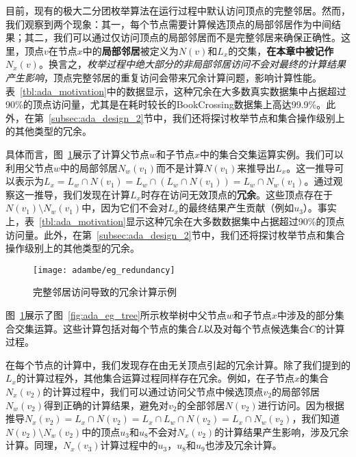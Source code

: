 目前，现有的极大二分团枚举算法在运行过程中默认访问顶点的完整邻居。然而，我们观察到两个现象：其一，每个节点需要计算候选顶点的局部邻居作为中间结果；其二，我们可以通过仅访问顶点的局部邻居而不是完整邻居来确保正确性。这里，顶点$v$在节点$x$中的\textbf{局部邻居}被定义为$N(v)$和$L_x$的交集，\textbf{在本章中被记作$N_x(v)$}。换言之，\emph{枚举过程中绝大部分的非局部邻居访问不会对最终的计算结果产生影响}，顶点完整邻居的重复访问会带来冗余计算问题，影响计算性能。表~\ref{tbl:ada_motivation}中的数据显示，这种冗余在大多数真实数据集中占据超过90\%的顶点访问量，尤其是在耗时较长的BookCrossing数据集上高达99.9\%。此外，在第~\ref{subsec:ada_design_2}节中，我们还将探讨枚举节点和集合操作级别上的其他类型的冗余。

具体而言，图~\ref{fig:ada_motivation_2}展示了计算父节点$w$和子节点$x$中的集合交集运算实例。我们可以利用父节点$w$中的局部邻居$N_w(v_1)$而不是计算$N(v_1)$来推导出$L_x$。这一推导可以表示为$L_x = L_w \cap N(v_1) = L_w \cap (L_w \cap N(v_1)) = L_w \cap N_w(v_1)$。通过观察这一推导，我们发现在计算$L_x$时存在访问无效顶点的\textbf{冗余}。这些顶点存在于$N(v_1) \setminus N_w(v_1)$中，因为它们不会对$L_x$的最终结果产生贡献（例如$u_3$）。事实上，表~\ref{tbl:ada_motivation}显示这种冗余在大多数数据集中占据超过90\%的顶点访问量。此外，在第~\ref{subsec:ada_design_2}节中，我们还将探讨枚举节点和集合操作级别上的其他类型的冗余。


\begin{figure} [H]
	\centering
	\texttt{[image: adambe/eg\_redundancy]}
	\caption{完整邻居访问导致的冗余计算示例}

	\label{fig:ada_motivation_2}

\end{figure}

\begin{example}
  图~\ref{fig:ada_motivation_2}展示了图~\ref{fig:ada_eg_tree}所示枚举树中父节点$w$和子节点$x$中涉及的部分集合交集运算。这些计算包括对每个节点的集合$L$以及对每个节点候选集合$C$的计算过程。

  在每个节点的计算中，我们发现存在由无关顶点引起的冗余计算。除了我们提到的$L_x$的计算过程外，其他集合运算过程同样存在冗余。例如，在子节点$x$的集合$N_x(v_2)$的计算过程中，我们可以通过访问父节点中候选顶点$v_2$的局部邻居$N_w(v_2)$得到正确的计算结果，避免对$v_2$的全部邻居$N(v_2)$进行访问。因为根据推导$N_x(v_2) = L_x\cap N(v_2) = L_x \cap L_w \cap N(v_2) = L_x \cap N_w(v_2)$，我们知道$N(v_2)\setminus N_w(v_2)$中的顶点$u_3$和$u_8$不会对$N_x(v_2)$的计算结果产生影响，涉及冗余计算。同理，$N_x(v_3)$计算过程中的$u_3$，$u_8$和$u_9$也涉及冗余计算。
  
\end{example}


